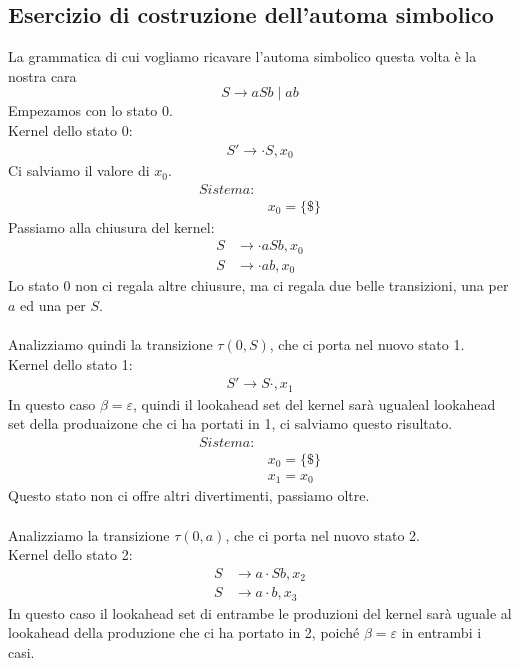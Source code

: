 \documentclass[class=book, crop=false, oneside, 12pt]{standalone}
\begin{document}
\subsection{Esercizio di costruzione dell'automa simbolico}
La grammatica di cui vogliamo ricavare l'automa simbolico questa volta è la nostra cara
\begin{equation}
    S \to aSb \mid ab
\end{equation}
Empezamos con lo stato 0.
\\
Kernel dello stato 0:
\begin{align*}
    S' \to \cdot S, x_0
\end{align*}
Ci salviamo il valore di \(x_0\).
\begin{align*}
    Sistema:& \\
            & x_0 = \{\$\}
\end{align*} 
Passiamo alla chiusura del kernel:
\begin{align*}
    S &\to \cdot aSb, x_0 \\
    S &\to \cdot ab, x_0
\end{align*}
Lo stato 0 non ci regala altre chiusure, ma ci regala due belle transizioni, una per \(a\) ed una per \(S\).
\\\\
Analizziamo quindi la transizione \(\tau(0,S)\), che ci porta nel nuovo stato 1.
\\
Kernel dello stato 1:
\begin{align*}
    S' \to S \cdot, x_1
\end{align*}
In questo caso \(\beta = \varepsilon\), quindi il lookahead set del kernel sarà ugualeal lookahead set della produaizone che ci ha portati in 1, ci salviamo questo risultato.
\begin{align*}
    Sistema:& \\
            & x_0 = \{\$\}\\
            & x_1 = x_0
\end{align*}
Questo stato non ci offre altri divertimenti, passiamo oltre.
\\\\
Analizziamo la transizione \(\tau(0,a)\), che ci porta nel nuovo stato 2.
\\
Kernel dello stato 2:
\begin{align*}
    S &\to  a \cdot S b, x_2 \\
    S &\to  a \cdot b, x_3
\end{align*}
In questo caso il lookahead set di entrambe le produzioni del kernel sarà uguale al lookahead della produzione che ci ha portato in 2, poiché \(\beta = \varepsilon\) in entrambi i casi.
\end{document}
